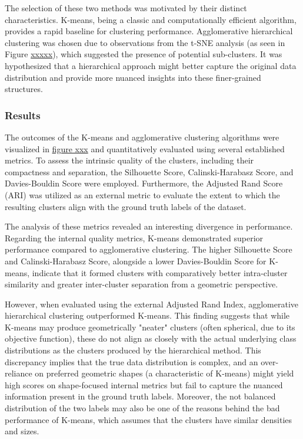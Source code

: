 \documentclass{article}
\begin{document}
The selection of these two methods was motivated by their distinct characteristics. K-means, being a classic and computationally efficient algorithm, provides a rapid baseline for clustering performance. Agglomerative hierarchical clustering was chosen due to observations from the t-SNE analysis (as seen in Figure \underline{xxxxx}), which suggested the presence of potential sub-clusters. It was hypothesized that a hierarchical approach might better capture the original data distribution and provide more nuanced insights into these finer-grained structures.

\subsubsection*{Results}

The outcomes of the K-means and agglomerative clustering algorithms were visualized in \underline{figure xxx} and quantitatively evaluated using several established metrics. To assess the intrinsic quality of the clusters, including their compactness and separation, the Silhouette Score, Calinski-Harabasz Score, and Davies-Bouldin Score were employed. Furthermore, the Adjusted Rand Score (ARI) was utilized as an external metric to evaluate the extent to which the resulting clusters align with the ground truth labels of the dataset.

The analysis of these metrics revealed an interesting divergence in performance. Regarding the internal quality metrics, K-means demonstrated superior performance compared to agglomerative clustering. The higher Silhouette Score and Calinski-Harabasz Score, alongside a lower Davies-Bouldin Score for K-means, indicate that it formed clusters with comparatively better intra-cluster similarity and greater inter-cluster separation from a geometric perspective.

However, when evaluated using the external Adjusted Rand Index, agglomerative hierarchical clustering outperformed K-means. This finding suggests that while K-means may produce geometrically "neater" clusters (often spherical, due to its objective function), these do not align as closely with the actual underlying class distributions as the clusters produced by the hierarchical method. This discrepancy implies that the true data distribution is complex, and an over-reliance on preferred geometric shapes (a characteristic of K-means) might yield high scores on shape-focused internal metrics but fail to capture the nuanced information present in the ground truth labels. Moreover, the not balanced distribution of the two labels may also be one of the reasons behind the bad performance of K-means, which assumes that the clusters have similar densities and sizes.
\end{document}
